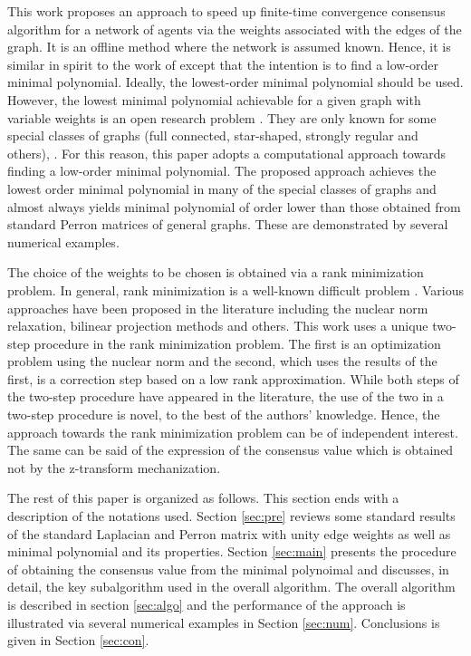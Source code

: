 \documentclass[onecolumn,reviewcopy]{autart}
\begin{document}
This work proposes an approach to speed up finite-time convergence consensus algorithm for a network of agents via the weights associated with the edges of the graph. It is an offline method where the network is assumed known. Hence, it is similar in spirit to the work of \cite{ART:XB04} except that the intention is to find a low-order minimal polynomial. Ideally, the lowest-order minimal polynomial should be used. However, the lowest minimal polynomial achievable for a given graph with variable weights is an open research problem \citep{ART:FH07}. They are only known for some special classes of graphs (full connected, star-shaped, strongly regular and others), \citep{ART:VH98,ART:VKT14}. For this reason, this paper adopts a computational approach towards finding a low-order minimal polynomial. The proposed approach achieves the lowest order minimal polynomial in many of the special classes of graphs and almost always yields minimal polynomial of order lower than those obtained from standard Perron matrices of general graphs. These are demonstrated by several numerical examples.

The choice of the weights to be chosen is obtained via a rank minimization problem. In general, rank minimization is a well-known difficult problem \citep{INP:FHB04,ART:RFP10}. Various approaches have been proposed in the literature including the nuclear norm relaxation, bilinear projection methods and others. This work uses a unique two-step procedure in the rank minimization problem. The first is an optimization problem using the nuclear norm and the second, which uses the results of the first, is a correction step based on a low rank approximation.
While both steps of the two-step procedure have appeared in the literature, the use of the two in a two-step procedure is novel, to the best of the authors' knowledge. Hence, the approach towards the rank minimization problem can be of independent interest. The same can be said of the expression of the consensus value which is obtained not by the z-transform mechanization.

The rest of this paper is organized as follows. This section ends with a description of the notations used. Section \ref{sec:pre} reviews some standard results of the standard Laplacian and Perron matrix with unity edge weights as well as minimal polynomial and its properties. Section \ref{sec:main} presents the procedure of obtaining the consensus value from the minimal polynoimal and discusses, in detail, the key subalgorithm used in the overall algorithm. The overall algorithm is described in section \ref{sec:algo} and the performance of the approach is illustrated via several numerical examples in Section \ref{sec:num}. Conclusions is given in Section \ref{sec:con}.
\end{document}
